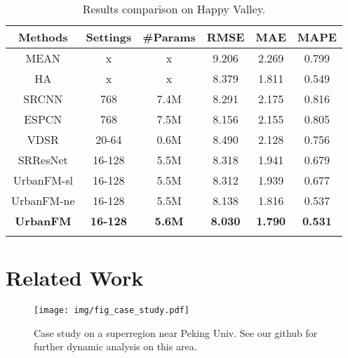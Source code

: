\begin{table}[htbp]
  \centering
\caption{Results comparison on Happy Valley.}
  \vspace{-0.8em}
    \begin{tabular}{c|cc|ccc}
    \shline
    Methods & Settings & \#Params & RMSE  & MAE   & MAPE \\
    \hline
    MEAN  & x     & x     & 9.206 & 2.269 & 0.799 \\
    HA    & x     & x     & 8.379 & 1.811 & 0.549 \\
    \hline
    SRCNN & 768   & 7.4M & 8.291 & 2.175 & 0.816 \\
    ESPCN & 768   & 7.5M & 8.156 & 2.155 & 0.805 \\
    VDSR  & 20-64 & 0.6M & 8.490 & 2.128 & 0.756 \\
    SRResNet & 16-128 & 5.5M & 8.318 & 1.941 & 0.679 \\
    \hline
    UrbanFM-sl & 16-128 & 5.5M & 8.312 & 1.939 & 0.677 \\
    UrbanFM-ne & 16-128 & 5.5M & 8.138 & 1.816 & 0.537 \\
    \textbf{UrbanFM} & \textbf{16-128} & \textbf{5.6M} & \textbf{8.030} & \textbf{1.790} & \textbf{0.531} \\
    \shline
    \end{tabular}\label{tab:hv}\end{table} 


\section{Related Work}
\begin{figure}[!t]
	\centering
	\texttt{[image: img/fig\_case\_study.pdf]}
	\vspace{-1em}
	\caption{\label{fig:case_study} Case study on a superregion near Peking Univ. See our github for further dynamic analysis on this area.}	
	\vspace{-1em}
\end{figure}



